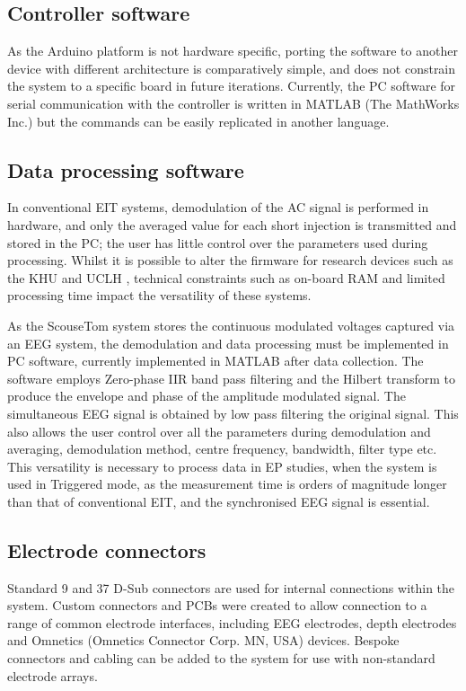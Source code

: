 
\subsection{Controller software}

As the Arduino platform is not hardware specific, porting the software to another device with different architecture is comparatively simple, and does not constrain the system to a specific board in future iterations. Currently, the PC software for serial communication with the controller is written in MATLAB (The MathWorks Inc.) but the commands can be easily replicated in another language.

\subsection{Data processing software}

In conventional EIT systems, demodulation of the AC signal is performed in hardware, and only the averaged value for each short injection is transmitted and stored in the PC; the user has little control over the parameters used during processing. Whilst it is possible to alter the firmware for research devices such as the KHU \cite{Hun_Wi_2014} and UCLH \cite{McEwan_2006}, technical constraints such as on-board RAM and limited processing time impact the versatility of these systems. 

As the ScouseTom system stores the continuous modulated voltages captured via an EEG system, the demodulation and data processing must be implemented in PC software, currently implemented in MATLAB after data collection. The software employs Zero-phase IIR band pass filtering and the Hilbert transform to produce the envelope and phase of the amplitude modulated signal. The simultaneous EEG signal is obtained by low pass filtering the original signal. This also allows the user control over all the parameters during demodulation and averaging, demodulation method, centre frequency, bandwidth, filter type etc. This versatility is necessary to process data in EP studies, when the system is used in Triggered mode, as the measurement time is orders of magnitude longer than that of conventional EIT, and the synchronised EEG signal is essential. 

\subsection{Electrode connectors}

Standard 9 and 37 D-Sub connectors are used for internal connections within the system. Custom connectors and PCBs were created to allow connection to a range of common electrode interfaces, including EEG electrodes, depth electrodes and Omnetics (Omnetics Connector Corp. MN, USA) devices. Bespoke connectors and cabling can be added to the system for use with non-standard electrode arrays.